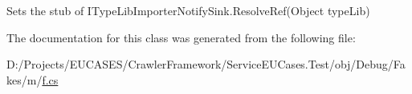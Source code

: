 Sets the stub of I\-Type\-Lib\-Importer\-Notify\-Sink.\-Resolve\-Ref(\-Object type\-Lib)



The documentation for this class was generated from the following file\-:\begin{DoxyCompactItemize}
\item 
D\-:/\-Projects/\-E\-U\-C\-A\-S\-E\-S/\-Crawler\-Framework/\-Service\-E\-U\-Cases.\-Test/obj/\-Debug/\-Fakes/m/\hyperlink{m_2f_8cs}{f.\-cs}\end{DoxyCompactItemize}
